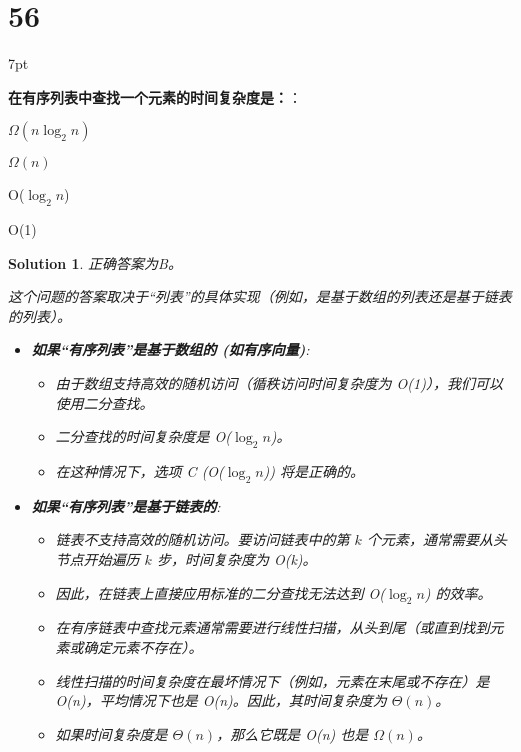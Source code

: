 \documentclass[UTF8]{report}
\newtheorem{solution}{Solution}
\theoremstyle{MyLineTheoremStyle} %
\theoremstyle{MyBlockTheoremStyle} %
\theoremstyle{MySubsubsectionStyle} %
\newenvironment{graybox}{%
        \def\FrameCommand{%
        \hspace{1pt}%
        {\color{gray}\small \vrule width 2pt}%
        {\color{graybox_color}\vrule width 4pt}%
        \colorbox{graybox_color}%
        }%
        \MakeFramed{\advance\hsize-\width\FrameRestore}%
        \noindent\hspace{-4.55pt}%
        \begin{adjustwidth}{}{7pt}%
        \vspace{2pt}\vspace{2pt}%
        }
        {%
        \vspace{2pt}\end{adjustwidth}\endMakeFramed%
        }
\begin{document}
\section*{56}

\begin{graybox}
\textbf{在有序列表中查找一个元素的时间复杂度是：}：
\begin{circledenum}
    \item $\Omega(n\log_{2}n)$
    \item $\Omega(n)$
    \item O($\log_{2}n$)
    \item O(1)
\end{circledenum}
\end{graybox}

\begin{solution}
正确答案为B。

这个问题的答案取决于“列表”的具体实现（例如，是基于数组的列表还是基于链表的列表）。

\begin{itemize}
    \item \textbf{如果“有序列表”是基于数组的 (如有序向量)}:
    \begin{itemize}
        \item 由于数组支持高效的随机访问（循秩访问时间复杂度为 O(1)），我们可以使用二分查找。
        \item 二分查找的时间复杂度是 O($\log_2 n$)。
        \item 在这种情况下，选项 C (O($\log_2 n$)) 将是正确的。
    \end{itemize}

    \item \textbf{如果“有序列表”是基于链表的}:
    \begin{itemize}
        \item 链表不支持高效的随机访问。要访问链表中的第 $k$ 个元素，通常需要从头节点开始遍历 $k$ 步，时间复杂度为 O(k)。
        \item 因此，在链表上直接应用标准的二分查找无法达到 O($\log_2 n$) 的效率。
        \item 在有序链表中查找元素通常需要进行线性扫描，从头到尾（或直到找到元素或确定元素不存在）。
        \item 线性扫描的时间复杂度在最坏情况下（例如，元素在末尾或不存在）是 O(n)，平均情况下也是 O(n)。因此，其时间复杂度为 $\Theta(n)$。
        \item 如果时间复杂度是 $\Theta(n)$，那么它既是 O(n) 也是 $\Omega(n)$。
    \end{itemize}
\end{itemize}


\end{solution}
\end{document}
